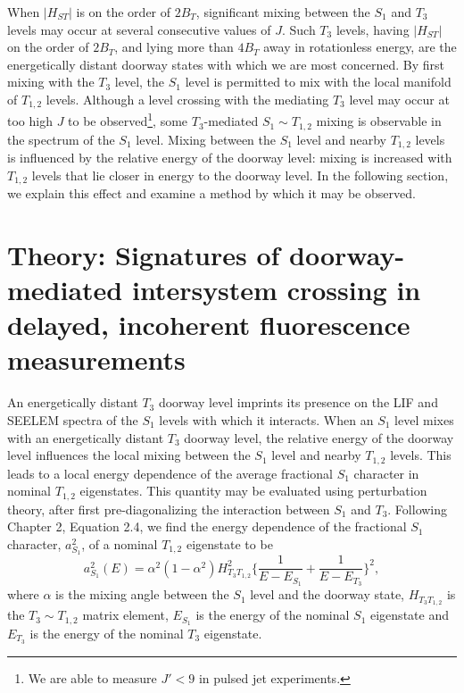 When $\lvert H_{ST} \rvert$ is on the order of $2B_T$, significant
mixing between the $S_1$ and $T_3$ levels may occur at several
consecutive values of $J$.  Such $T_3$ levels, having $\lvert H_{ST}
\rvert$ on the order of $2B_T$, and lying more than $4B_T$ away in
rotationless energy, are the energetically distant doorway states with
which we are most concerned.  By first mixing with the $T_3$ level,
the $S_1$ level is permitted to mix with the local manifold of
$T_{1,2}$ levels.  Although a level crossing with the mediating $T_3$
level may occur at too high $J$ to be observed\footnote{We are able to
  measure $J' < 9$ in pulsed jet experiments.}, some $T_3$-mediated
$S_1 \sim T_{1,2}$ mixing is observable in the spectrum of the $S_1$
level.  Mixing between the $S_1$ level and nearby $T_{1,2}$ levels is
influenced by the relative energy of the doorway level: mixing is
increased with $T_{1,2}$ levels that lie closer in energy to the
doorway level.  In the following section, we explain this effect and
examine a method by which it may be observed.



























\section{Theory: Signatures of doorway-mediated intersystem crossing
  in delayed, incoherent fluorescence measurements}

An energetically distant $T_3$ doorway level imprints its presence on
the LIF and SEELEM spectra of the $S_1$ levels with which it
interacts.  When an $S_1$ level mixes with an energetically distant
$T_3$ doorway level, the relative energy of the doorway level
influences the local mixing between the $S_1$ level and nearby
$T_{1,2}$ levels.  This leads to a local energy dependence of the
average fractional $S_1$ character in nominal $T_{1,2}$ eigenstates.
This quantity may be evaluated using perturbation theory, after first
pre-diagonalizing the interaction between $S_1$ and $T_3$.  Following
Chapter 2, Equation 2.4, we find the energy dependence of the
fractional $S_1$ character, $a_{S_1}^2$, of a nominal $T_{1,2}$
eigenstate to be
\begin{equation}
  \label{eq:ave-s1-char}
    a_{S_1}^2(E) = 
    \alpha^2 (1-\alpha^2) H_{T_3T_{1,2}}^2
    \biggl \lbrace 
    \frac{1}{E - E_{S_1}} 
    + \frac{1}{E - E_{T_3}} 
    \biggr \rbrace^2,
\end{equation}
where $\alpha$ is the mixing angle between the $S_1$ level and the
doorway state, $H_{T_3T_{1,2}}$ is the $T_3 \sim T_{1,2}$ matrix
element, $E_{S_1}$ is the energy of the nominal $S_1$ eigenstate and
$E_{T_3}$ is the energy of the nominal $T_3$ eigenstate.

